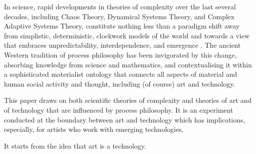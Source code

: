 \documentclass[letterpaper]{article}
\begin{document}
    In science, rapid developments in theories of complexity over the last several decades, including Chaos Theory, Dynamical Systems Theory, and Complex Adaptive Systems Theory, constitute nothing less than a paradigm shift away from simplistic, deterministic, clockwork models of the world and towards a view that embraces unpredictability, interdependence, and emergence \citep{StengersOrdrOtOfChs1984}. The ancient Western tradition of process philosophy \citep{SeibtStnfrdEncyclpdPrcssPhlsphy1974} has been invigorated by this change, absorbing knowledge from science and mathematics, and contextualising it within a sophisticated materialist ontology that connects all aspects of material and human social activity and thought, including (of course) art and technology.
    
    This paper draws on both scientific theories of complexity and theories of art and of technology that are influenced by process philosophy. It is an experiment conducted at the boundary between art and technology which has implications, especially, for artists who work with emerging technologies.
    
    It starts from the idea that art is a technology.
\end{document}
